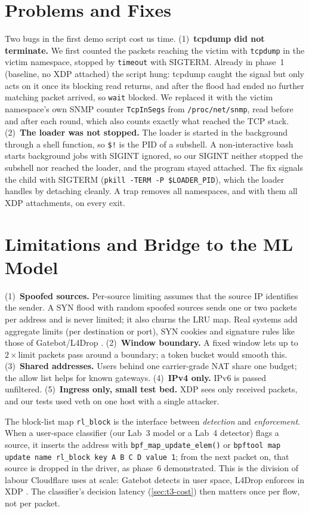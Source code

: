 \section{Problems and Fixes}\label{sec:t4-problems}
Two bugs in the first demo script cost us time. (1)~\textbf{tcpdump did not terminate.} We first counted the packets reaching the victim with \texttt{tcpdump} in the victim namespace, stopped by \texttt{timeout} with SIGTERM. Already in phase~1 (baseline, no XDP attached) the script hung: tcpdump caught the signal but only acts on it once its blocking read returns, and after the flood had ended no further matching packet arrived, so \texttt{wait} blocked. We replaced it with the victim namespace's own SNMP counter \texttt{TcpInSegs} from \texttt{/proc/net/snmp}, read before and after each round, which also counts exactly what reached the TCP stack. (2)~\textbf{The loader was not stopped.} The loader is started in the background through a shell function, so \verb|$!| is the PID of a subshell. A non-interactive bash starts background jobs with SIGINT ignored, so our SIGINT neither stopped the subshell nor reached the loader, and the program stayed attached. The fix signals the child with SIGTERM (\texttt{pkill -TERM -P \$LOADER\_PID}), which the loader handles by detaching cleanly. A trap removes all namespaces, and with them all XDP attachments, on every exit.

\section{Limitations and Bridge to the ML Model}\label{sec:t4-limits}\label{sec:t4-bridge}
(1)~\textbf{Spoofed sources.} Per-source limiting assumes that the source IP identifies the sender. A SYN flood with random spoofed sources sends one or two packets per address and is never limited; it also churns the LRU map. Real systems add aggregate limits (per destination or port), SYN cookies and signature rules like those of Gatebot/L4Drop \autocite{cf_l4drop}. (2)~\textbf{Window boundary.} A fixed window lets up to $2\times$limit packets pass around a boundary; a token bucket would smooth this. (3)~\textbf{Shared addresses.} Users behind one carrier-grade NAT share one budget; the allow list helps for known gateways. (4)~\textbf{IPv4 only.} IPv6 is passed unfiltered. (5)~\textbf{Ingress only, small test bed.} XDP sees only received packets, and our tests used veth on one host with a single attacker.

The block-list map \texttt{rl\_block} is the interface between \emph{detection} and \emph{enforcement}. When a user-space classifier (our Lab~3 model or a Lab~4 detector) flags a source, it inserts the address with \texttt{bpf\_map\_update\_elem()} or \texttt{bpftool map update name rl\_block key A B C D value 1}; from the next packet on, that source is dropped in the driver, as phase~6 demonstrated. This is the division of labour Cloudflare uses at scale: Gatebot detects in user space, L4Drop enforces in XDP \autocite{cf_gatebot,cf_l4drop}. The classifier's decision latency (\cref{sec:t3-cost}) then matters once per flow, not per packet.
